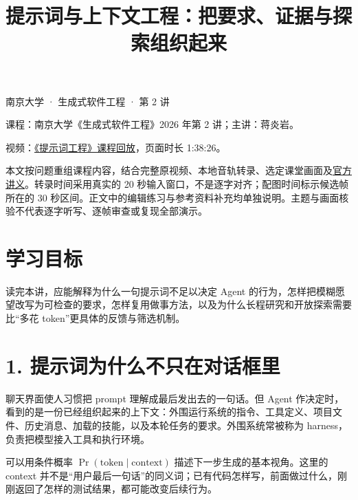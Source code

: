 \documentclass[
  11pt,
  fontset=fandol]{ctexart}
\title{提示词与上下文工程：把要求、证据与探索组织起来}
\author{}
\date{}
\providecommand{\LectureCourseLabel}{南京大学 · 生成式软件工程}
\renewcommand{\maketitle}{%
  \begin{center}
  {\LARGE\sffamily\bfseries\color{inkblue}\thetitle\par}
  \vspace{5mm}
  {\small\sffamily\color{muted}\LectureCourseLabel}
  \end{center}\vspace{4mm}\thispagestyle{fancy}}
\renewcommand{\LectureCourseLabel}{南京大学 · 生成式软件工程 · 第 2 讲}
\begin{document}
\maketitle

课程：南京大学《生成式软件工程》2026 年第 2 讲；主讲：蒋炎岩。

视频：\href{https://www.bilibili.com/video/BV1CQt365EzW/}{《提示词工程》课程回放}，页面时长
1:38:26。

本文按问题重组课程内容，结合完整原视频、本地音轨转录、选定课堂画面及\href{https://jyywiki.cn/GSE/2026/lect2.md}{官方讲义}。转录时间采用真实的
20 秒输入窗口，不是逐字对齐；配图时间标示候选帧所在的 30
秒区间。正文中的编辑练习与参考资料补充均单独说明。主题与画面核验不代表逐字听写、逐帧审查或复现全部演示。

\section{学习目标}\label{ux5b66ux4e60ux76eeux6807}

读完本讲，应能解释为什么一句提示词不足以决定 Agent
的行为，怎样把模糊愿望改写为可检查的要求，怎样复用做事方法，以及为什么长程研究和开放探索需要比``多花
token''更具体的反馈与筛选机制。

\section{1.
提示词为什么不只在对话框里}\label{ux63d0ux793aux8bcdux4e3aux4ec0ux4e48ux4e0dux53eaux5728ux5bf9ux8bddux6846ux91cc}

聊天界面使人习惯把 prompt 理解成最后发出去的一句话。但 Agent
作决定时，看到的是一份已经组织起来的上下文：外围运行系统的指令、工具定义、项目文件、历史消息、加载的技能，以及本轮任务的要求。外围系统常被称为
harness，负责把模型接入工具和执行环境。

可以用条件概率 \(\Pr(\text{token}\mid\text{context})\)
描述下一步生成的基本视角。这里的 context
并不是``用户最后一句话''的同义词；已有代码怎样写，前面做过什么，刚刚返回了怎样的测试结果，都可能改变后续行为。

\end{document}
